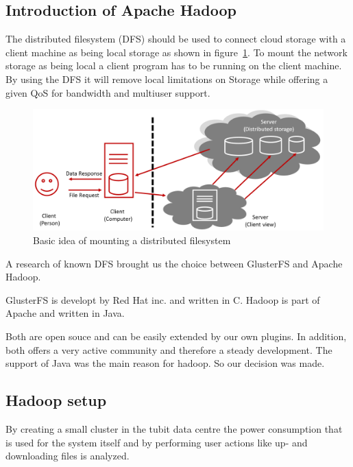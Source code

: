 \subsection{Introduction of Apache Hadoop}

The distributed filesystem (DFS) should be used to connect cloud storage with a client machine as being local storage as shown in figure~\ref{fig:dfs_example}. To mount the network storage as being local a client program has to be running on the client machine. By using the DFS it will remove local limitations on Storage while offering a given QoS for bandwidth and multiuser support.


\begin{figure}
	\centering
	\includegraphics[width=1\linewidth]{img/dfs_example.png}
	\caption{Basic idea of mounting a distributed filesystem}
	\label{fig:dfs_example}
\end{figure}

A research of known DFS brought us the choice between GlusterFS and Apache Hadoop.

GlusterFS is developt by Red Hat inc. and written in C. Hadoop is part of Apache and written in Java.

Both are open souce and can be easily extended by our own plugins. In addition, both offers a very active community and therefore a steady development. The support of Java was the main reason for hadoop. So our decision was made.


\subsection{Hadoop setup}

By creating a small cluster in the tubit data centre the power consumption that is used for the system itself and by performing user actions like up- and downloading files is analyzed.

